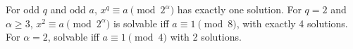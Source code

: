 For odd $q$ and odd $a$, $x^q \equiv a \pmod{2^\alpha}$ has exactly one solution. For $q=2$ and $\alpha \geq 3$, $x^2 \equiv a \pmod{2^\alpha}$ is solvable iff $a \equiv 1 \pmod{8}$, with exactly 4 solutions. For $\alpha=2$, solvable iff $a \equiv 1 \pmod{4}$ with 2 solutions.
